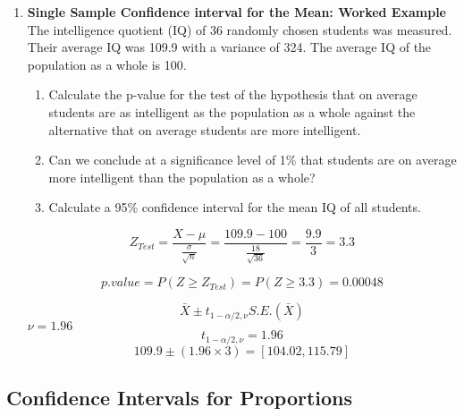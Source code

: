 \documentclass[]{report}
\begin{document}
\begin{enumerate}
\item \textbf{Single Sample Confidence interval for the Mean: Worked Example}\\

The intelligence quotient (IQ) of 36 randomly chosen students was measured.
Their average IQ was 109.9 with a variance of 324.
The average IQ of the population as a whole is 100.

\begin{enumerate}
\item Calculate the p-value for the test of the hypothesis that on average
students are as intelligent as the population as a whole against the alternative that on average students are more intelligent.


\item Can we conclude at a significance level of 1\% that students are on average more intelligent than the population as a whole?

\item Calculate a 95\% confidence interval for the mean IQ of all students.

\end{enumerate}

\begin{equation}
Z_{Test} = \frac{X- \mu}{\frac{\sigma}{\sqrt{n}}} = \frac{109.9 - 100}{\frac{18}{\sqrt{36}}} = \frac{9.9}{3} = 3.3
\end{equation}


\begin{equation}
p.value = P(Z \geq Z_{Test}) = P(Z \geq 3.3) = 0.00048
\end{equation}



\begin{equation}
\bar{X} \pm t_{1-\alpha/2,\nu}S.E.(\bar{X})
\end{equation}
$\nu = 1.96$
\begin{equation}
t_{1-\alpha/2,\nu} = 1.96
\end{equation}
\begin{equation}
109.9 \pm (1.96 \times 3) = [104.02, 115.79]
\end{equation}



\end{enumerate}

\subsection{Confidence Intervals for Proportions}
\end{document}
